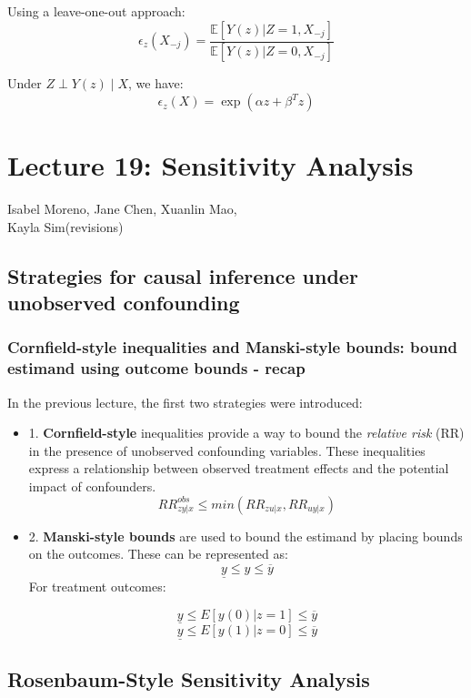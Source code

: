 Using a leave-one-out approach:
\[
\epsilon_z(X_{-j}) = \frac{\mathbb{E}[Y(z) | Z=1, X_{-j}]}{\mathbb{E}[Y(z) | Z=0, X_{-j}]}
\]

Under \(Z \perp Y(z) \mid X\), we have:
\[
\epsilon_z(X) = \exp(\alpha z + \beta^T z)
\]

\section{Lecture 19: Sensitivity Analysis}{Isabel Moreno,
Jane Chen,
Xuanlin Mao, \\ Kayla Sim(revisions)}

\subsection{Strategies for causal inference under unobserved confounding}

\subsubsection{Cornfield-style inequalities and Manski-style bounds: bound estimand using outcome bounds - recap}

In the previous lecture, the first two strategies were introduced:

\begin{itemize}
    \item 1. \textbf{Cornfield-style} inequalities provide a way to bound the \emph{relative risk} (RR) in the presence of unobserved confounding variables. These inequalities express a relationship between observed treatment effects and the potential impact of confounders.
\[RR^{obs}_{zy|x}\leq  min(RR_{zu|x},RR_{uy|x})\]

\item 2. \textbf{Manski-style bounds} are used to bound the estimand by placing bounds on the outcomes. These can be represented as:
\[
\underline{y} \leq y \leq \overline{y}
\]
For treatment outcomes:
\begin{itemize}
\[
\underline{y} \leq E[y(0) | z=1] \leq \overline{y}
\]
\[
\underline{y} \leq E[y(1) | z=0] \leq \overline{y}
\]

\end{itemize}
\end{itemize}

\subsection{Rosenbaum-Style Sensitivity Analysis}


